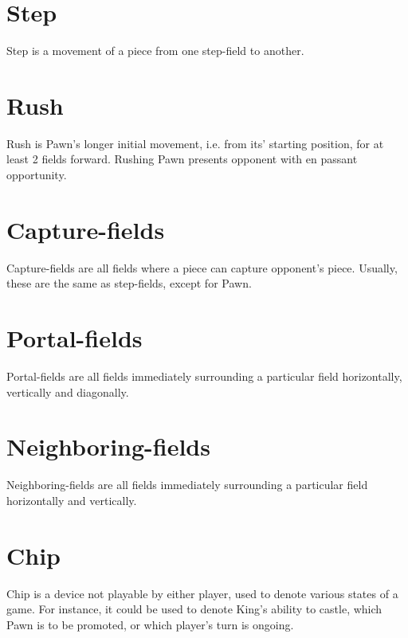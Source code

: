 \section*{Step}
\label{sec:Terms/Step}
Step is a movement of a piece from one step-field to another.

\section*{Rush}
\label{sec:Terms/Rush}
Rush is Pawn's longer initial movement, i.e. from its’ starting position, for at least 2 fields forward.
Rushing Pawn presents opponent with en passant opportunity.

\section*{Capture-fields}
\label{sec:Terms/Capture-fields}
Capture-fields are all fields where a piece can capture opponent's piece.
Usually, these are the same as step-fields, except for Pawn.


\section*{Portal-fields}
\label{sec:Terms/Portal-fields}
Portal-fields are all fields immediately surrounding a particular field horizontally,
vertically and diagonally.

\section*{Neighboring-fields}
\label{sec:Terms/Neighboring-fields}
Neighboring-fields are all fields immediately surrounding a particular field horizontally
and vertically.

\section*{Chip}
\label{sec:Terms/Chip}
Chip is a device not playable by either player, used to denote various states
of a game. For instance, it could be used to denote King's ability to castle,
which Pawn is to be promoted, or which player's turn is ongoing.

